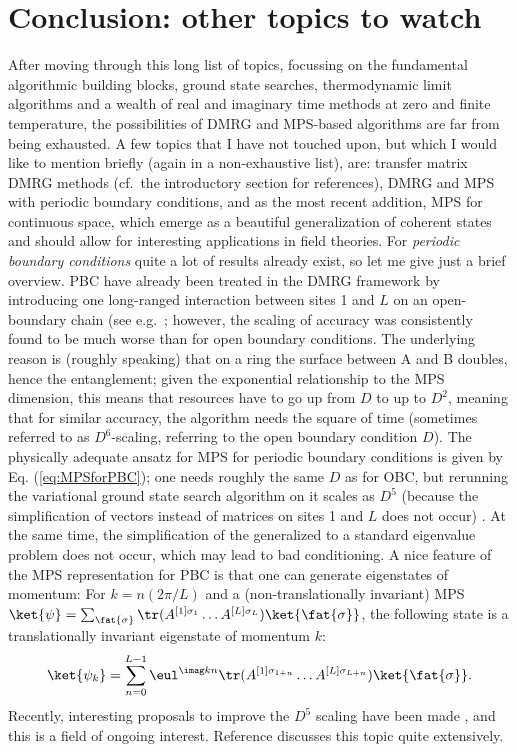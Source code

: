 \section{Conclusion: other topics to watch}
After moving through this long list of topics, focussing on the fundamental algorithmic building blocks, ground state searches, thermodynamic limit algorithms and a wealth of real and imaginary time methods at zero and finite temperature, the possibilities of DMRG and MPS-based algorithms are far from being exhausted. A few topics that I have not touched upon, but which I would like to mention briefly (again in a non-exhaustive list), are: transfer matrix DMRG methods (cf.\ the introductory section for references), DMRG and MPS with periodic boundary conditions, and as the most recent addition, MPS for continuous space\cite{Verstraete10}, which emerge as a beautiful generalization of coherent states and should allow for interesting applications in field theories. For {\em periodic boundary conditions} quite a lot of results already exist, so let me give just a brief overview. PBC have already been treated in the DMRG framework by introducing one long-ranged interaction between sites 1 and $L$ on an open-boundary chain (see e.g.\ \cite{Schmitteckert96,Rapsch99,Meden03a,Meden03b}; however, the scaling of accuracy was consistently found to be much worse than for open boundary conditions. The underlying reason is (roughly speaking) that on a ring the surface between A and B doubles, hence the entanglement; given the exponential relationship to the MPS dimension, this means that resources have to go up from $D$ to up to $D^2$, meaning that for similar accuracy, the algorithm needs the square of time (sometimes referred to as $D^6$-scaling, referring to the open boundary condition $D$). The physically adequate ansatz for MPS for periodic boundary conditions is given by Eq. (\ref{eq:MPSforPBC}); one needs roughly the same $D$ as for OBC, but rerunning the variational ground state search algorithm on it scales as $D^5$ (because the simplification of vectors instead of matrices on sites 1 and $L$ does not occur) \cite{VerstraetePorras04}. At the same time, the simplification of the generalized to a standard eigenvalue problem does not occur, which may lead to bad conditioning. A nice feature of the MPS representation for PBC is that one can generate eigenstates of momentum: For $k = n (2\pi/L)$ and a (non-translationally invariant) MPS $\ket{\psi} = \sum_{{\fat{\sigma}}} \tr (A^{[1]\sigma_1} \ldots A^{[L]\sigma_L}) \ket{\fat{\sigma}}$, the following state is a translationally invariant eigenstate of momentum $k$: \cite{Porras06}
\begin{equation}
\ket{\psi_k} = \sum_{n=0}^{L-1} \eul^{\imag k n}  \tr (A^{[1]\sigma_{1+n}} \ldots A^{[L]\sigma_{L+n}}) \ket{\fat{\sigma}} .
\end{equation}
Recently, interesting proposals to improve the $D^5$ scaling have been made \cite{Pippan10,Pirvu10}, and this is a field of ongoing interest. Reference \cite{VerstraeteMurg08} discusses this topic quite extensively.

